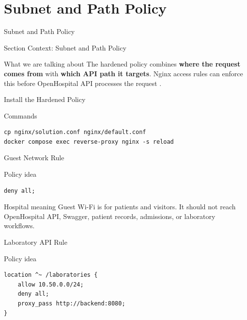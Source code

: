 \documentclass[presentation]{beamer}
\newcommand{\sectiontitleframe}[1]{
\begin{frame}[plain,c]
\begin{center}
{\usebeamerfont{title}\usebeamercolor[fg]{title}#1}
\end{center}
\end{frame}
}
\begin{document}
\section{Subnet and Path Policy}
\sectiontitleframe{Subnet and Path Policy}

\begin{frame}[c]{Section Context: Subnet and Path Policy}
\begin{block}{What we are talking about}
The hardened policy combines \textbf{where the request comes from} with \textbf{which API path it
targets}. Nginx access rules can enforce this before OpenHospital API processes the request
\cite{nginx_access}.
\end{block}
\end{frame}

\begin{frame}[fragile,c]{Install the Hardened Policy}
\begin{block}{Commands}
\begin{verbatim}
cp nginx/solution.conf nginx/default.conf
docker compose exec reverse-proxy nginx -s reload
\end{verbatim}
\end{block}
\end{frame}

\begin{frame}[fragile,c]{Guest Network Rule}
\begin{block}{Policy idea}
\begin{verbatim}
deny all;
\end{verbatim}
\end{block}

\begin{exampleblock}{Hospital meaning}
Guest Wi-Fi is for patients and visitors. It should not reach OpenHospital API, Swagger, patient
records, admissions, or laboratory workflows.
\end{exampleblock}
\end{frame}

\begin{frame}[fragile,c]{Laboratory API Rule}
\begin{block}{Policy idea}
\begin{verbatim}
location ^~ /laboratories {
    allow 10.50.0.0/24;
    deny all;
    proxy_pass http://backend:8080;
}
\end{verbatim}
\end{block}
\end{frame}
\end{document}
